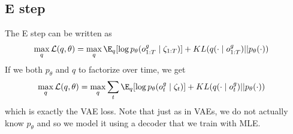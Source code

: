 \subsection{E step}
The E step can be written as
\begin{align}\label{eq:lb-vae-term}
\max_q \mathcal L(q, \theta)
&=
\max_q
\E_q[ \log
    p_\theta(o_{1:T}^g \mid \zeta_{1:T})
]
+ KL(
    q( \cdot \mid o_{1:T}^g)
||
    p_\theta(\cdot)
) 
\end{align}
If we both $p_\theta$ and $q$ to factorize over time, we get
\begin{align}
\max_q \mathcal L(q, \theta)
&=
\max_q
\sum_t \E_q[ \log
    p_\theta(o_t^g \mid \zeta_t)
]
+ KL(
    q( \cdot \mid o_t^g)
||
    p_\theta(\cdot)
) 
\end{align}
which is exactly the VAE loss.
Note that just as in VAEs, we do not actually know $p_\theta$ and so we model it using a decoder that we train with MLE.